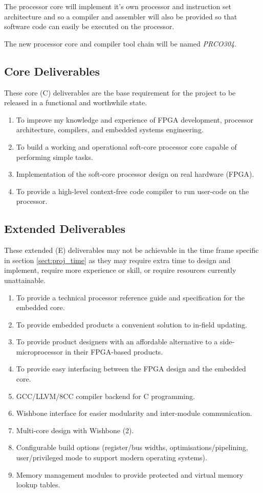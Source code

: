 \documentclass[11pt,a4paper]{report}
\newcommand{\scname}{PRCO304}
\begin{document}
The processor core will implement it's own processor and instruction set architecture and so a compiler and assembler will also be provided so that software code can easily be executed on the processor.

The new processor core and compiler tool chain will be named \textit{\scname{}}.

\subsection{Core Deliverables}
These core (C) deliverables are the base requirement for the project to be released in a functional and worthwhile state.
\begin{enumerate}[label=\bfseries C\arabic*.]
\item{To improve my knowledge and experience of FPGA development, processor architecture, compilers, and embedded systems engineering.}
\item{To build a working and operational soft-core processor core capable of performing simple tasks.}
\item{Implementation of the soft-core processor design on real hardware (FPGA).}
\item{To provide a high-level context-free code compiler to run user-code on the processor.}
\end{enumerate}


\subsection{Extended Deliverables}
These extended (E) deliverables may not be achievable in the time frame specific in section \ref{sect:proj_time} as they may require extra time to design and implement, require more experience or skill, or require resources currently unattainable.
\begin{enumerate}[label=\bfseries E\arabic*.]
\item{To provide a technical processor reference guide and specification for the embedded core.}
\item{To provide embedded products a convenient solution to in-field updating.}
\item{To provide product designers with an affordable alternative to a side-microprocessor in their FPGA-based products.}
\item{To provide easy interfacing between the FPGA design and the embedded core.}
\item{GCC/LLVM/8CC compiler backend for C programming.}\label{sect:deliv:ed:gcc}
\item{Wishbone interface for easier modularity and inter-module communication.}
\item{Multi-core design with Wishbone (2).}
\item{Configurable build options (register/bus widths, optimisations/pipelining, user/privileged mode to support modern operating systems).}
\item{Memory management modules to provide protected and virtual memory lookup tables.}
\end{enumerate}
\end{document}
